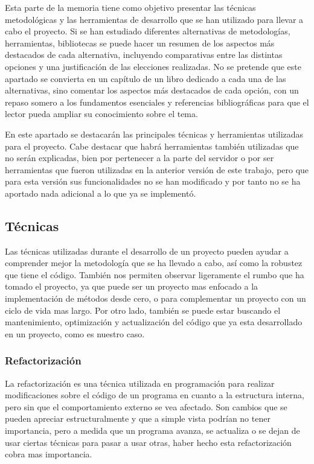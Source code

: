 
Esta parte de la memoria tiene como objetivo presentar las técnicas metodológicas y las herramientas de desarrollo que se han utilizado para llevar a cabo el proyecto. Si se han estudiado diferentes alternativas de metodologías, herramientas, bibliotecas se puede hacer un resumen de los aspectos más destacados de cada alternativa, incluyendo comparativas entre las distintas opciones y una justificación de las elecciones realizadas. 
No se pretende que este apartado se convierta en un capítulo de un libro dedicado a cada una de las alternativas, sino comentar los aspectos más destacados de cada opción, con un repaso somero a los fundamentos esenciales y referencias bibliográficas para que el lector pueda ampliar su conocimiento sobre el tema.


En este apartado se destacarán las principales técnicas y herramientas utilizadas para el proyecto. Cabe destacar que habrá herramientas también utilizadas que no serán explicadas, bien por pertenecer a la parte del servidor o por ser herramientas que fueron utilizadas en la anterior versión de este trabajo, pero que para esta versión sus funcionalidades no se han modificado y por tanto no se ha aportado nada adicional a lo que ya se implementó.

\subsection{Técnicas}

Las técnicas utilizadas durante el desarrollo de un proyecto pueden ayudar a comprender mejor la metodología que se ha llevado a cabo, así como la robustez que tiene el código. También nos permiten observar ligeramente el rumbo que ha tomado el proyecto, ya que puede ser un proyecto mas enfocado a la implementación de métodos desde cero, o para complementar un proyecto con un ciclo de vida mas largo. Por otro lado, también se puede estar buscando el mantenimiento, optimización y actualización del código que ya esta desarrollado en un proyecto, como es nuestro caso.

\subsubsection{Refactorización}

La refactorización es una técnica utilizada en programación para realizar modificaciones sobre el código de un programa en cuanto a la estructura interna, pero sin que el comportamiento externo se vea afectado. Son cambios que se pueden apreciar estructuralmente y que a simple vista podrían no tener importancia, pero a medida que un programa avanza, se actualiza o se dejan de usar ciertas técnicas para pasar a usar otras, haber hecho esta refactorización cobra mas importancia. 


